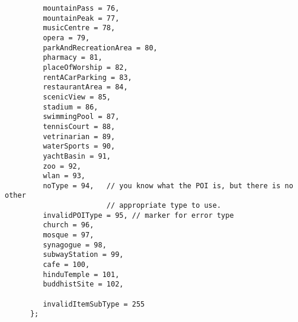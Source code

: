 \documentclass[a4paper]{article}
\begin{document}
\begin{verbatim}
         mountainPass = 76,
         mountainPeak = 77,
         musicCentre = 78,
         opera = 79,
         parkAndRecreationArea = 80,
         pharmacy = 81,
         placeOfWorship = 82,
         rentACarParking = 83,
         restaurantArea = 84,
         scenicView = 85,
         stadium = 86,
         swimmingPool = 87,
         tennisCourt = 88,
         vetrinarian = 89,
         waterSports = 90,
         yachtBasin = 91,
         zoo = 92,
         wlan = 93,
         noType = 94,   // you know what the POI is, but there is no other
                        // appropriate type to use.
         invalidPOIType = 95, // marker for error type
         church = 96,
         mosque = 97,
         synagogue = 98,
         subwayStation = 99,
         cafe = 100,
         hinduTemple = 101,
         buddhistSite = 102,

         invalidItemSubType = 255
      };
\end{verbatim}
\end{document}
